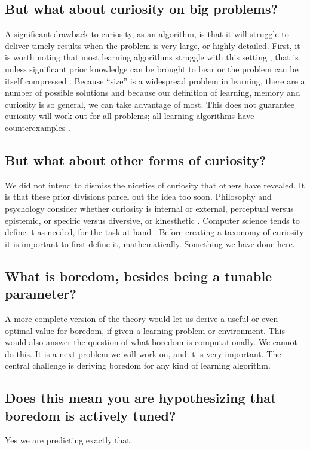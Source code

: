 \subsection*{But what about curiosity on big problems?}
A significant drawback to curiosity, as an algorithm, is that it will struggle to deliver timely results when the problem is very large, or highly detailed. First, it is worth noting that most learning algorithms struggle with this setting \citep{MacKay2003,Sutton2018}, that is unless significant prior knowledge can be brought to bear \citep{Zhang2020,Sutton2018} or the problem can be itself compressed \citep{Ha2018a,Fister2019}. Because ``size'' is a widespread problem in learning, there are a number of possible solutions and because our definition of learning, memory and curiosity is so general, we can take advantage of most. This does not guarantee curiosity will work out for all problems; all learning algorithms have counterexamples \citep{Wolpert1997}. 


\subsection*{But what about other forms of curiosity?}
We did not intend to dismiss the niceties of curiosity that others have revealed. It is that these prior divisions parcel out the idea too soon. Philosophy and psychology consider whether curiosity is internal or external, perceptual versus epistemic, or specific versus diversive, or kinesthetic \citep{Kidd2015,Berlyne1950,Zhou2020}. Computer science tends to define it as needed, for the task at hand \citep{Stanley2004,Lehman2011a,Lehman2013,Mouret2015,Colas2020}. Before creating a taxonomy of curiosity it is important to first define it, mathematically. Something we have done here.


\subsection*{What is boredom, besides being a tunable parameter?}
A more complete version of the theory would let us derive a useful or even optimal value for boredom, if given a learning problem or environment. This would also answer the question of what boredom is computationally. We cannot do this. It is a next problem we will work on, and it is very important. The central challenge is deriving boredom for any kind of learning algorithm.


\subsection*{Does this mean you are hypothesizing that boredom is actively tuned?}
Yes we are predicting exactly that.


